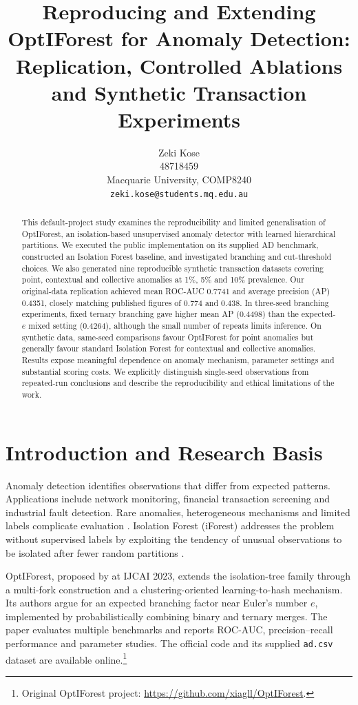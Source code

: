 \documentclass[11pt]{article}
\title{Reproducing and Extending OptIForest for Anomaly Detection: Replication, Controlled Ablations and Synthetic Transaction Experiments}
\author{Zeki Kose\\48718459\\Macquarie University, COMP8240\\\texttt{zeki.kose@students.mq.edu.au}}
\date{}
\begin{document}
\maketitle
\begin{abstract}
This default-project study examines the reproducibility and limited generalisation of OptIForest, an isolation-based unsupervised anomaly detector with learned hierarchical partitions. We executed the public implementation on its supplied AD benchmark, constructed an Isolation Forest baseline, and investigated branching and cut-threshold choices. We also generated nine reproducible synthetic transaction datasets covering point, contextual and collective anomalies at 1\%, 5\% and 10\% prevalence. Our original-data replication achieved mean ROC-AUC 0.7741 and average precision (AP) 0.4351, closely matching published figures of 0.774 and 0.438. In three-seed branching experiments, fixed ternary branching gave higher mean AP (0.4498) than the expected-$e$ mixed setting (0.4264), although the small number of repeats limits inference. On synthetic data, same-seed comparisons favour OptIForest for point anomalies but generally favour standard Isolation Forest for contextual and collective anomalies. Results expose meaningful dependence on anomaly mechanism, parameter settings and substantial scoring costs. We explicitly distinguish single-seed observations from repeated-run conclusions and describe the reproducibility and ethical limitations of the work.
\end{abstract}
 
\section{Introduction and Research Basis}
Anomaly detection identifies observations that differ from expected patterns. Applications include network monitoring, financial transaction screening and industrial fault detection. Rare anomalies, heterogeneous mechanisms and limited labels complicate evaluation \citep{pang2021}. Isolation Forest (iForest) addresses the problem without supervised labels by exploiting the tendency of unusual observations to be isolated after fewer random partitions \citep{liu2008,liu2012}.
 
OptIForest, proposed by \citet{xiang2023} at IJCAI 2023, extends the isolation-tree family through a multi-fork construction and a clustering-oriented learning-to-hash mechanism. Its authors argue for an expected branching factor near Euler's number $e$, implemented by probabilistically combining binary and ternary merges. The paper evaluates multiple benchmarks and reports ROC-AUC, precision--recall performance and parameter studies. The official code and its supplied \texttt{ad.csv} dataset are available online.\footnote{Original OptIForest project: \url{https://github.com/xiagll/OptIForest}.}
 
\end{document}
